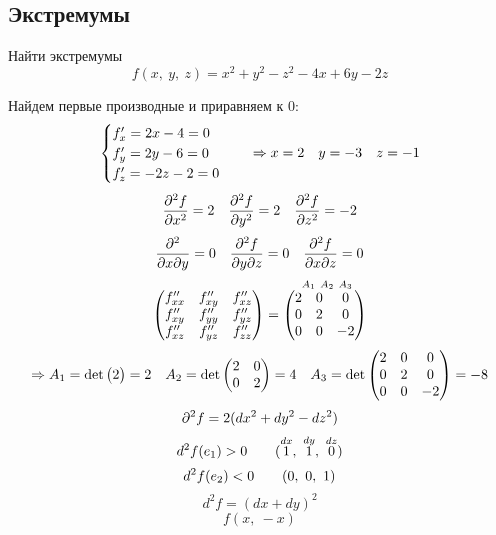 \documentclass[main]{subfiles}
\begin{document}
  \subsection{Экстремумы}

  \begin{example}
      Найти экстремумы
      \[f(x,\ y,\ z) = x^2 + y^2 - z^2 - 4x + 6y - 2z\]
  \end{example}

  \begin{sol}
      Найдем первые производные и приравняем к 0:
      \[\begin{cases}
        f'_x = 2x - 4 = 0\\
        f'_y = 2y - 6 = 0\\
        f'_z = - 2z - 2 = 0
      \end{cases} \quad \Rightarrow x = 2 \quad y = -3 \quad z = -1\]
      \[\dfrac{\partial^2 f}{\partial x^2} = 2 \quad \dfrac{\partial^2 f}{\partial y^2} = 2 \quad \dfrac{\partial^2 f}{\partial z^2} = - 2\]
      \[\dfrac{\partial^2 }{\partial x \partial y} = 0 \quad \dfrac{\partial^2 f}{\partial y \partial z} = 0 \quad \dfrac{\partial^2 f}{\partial x \partial z} = 0\]
      \[\begin{pmatrix}
        f''_{xx} & f''_{xy} & f''_{xz}\\
        f''_{xy} & f''_{yy} & f''_{yz}\\
        f''_{xz} & f''_{yz} & f''_{zz}
    \end{pmatrix} = \overset{\ A_1 \ A_2 \ A_3}{\begin{pmatrix}
        2 & 0 & 0\\
        0 & 2 & 0\\
        0 & 0 & -2
      \end{pmatrix}}\]
      \[\Rightarrow A_1 = \det \begin{pmatrix}
        2
      \end{pmatrix} = 2 \quad A_2 = \det \begin{pmatrix}
        2 & 0\\
        0 & 2
      \end{pmatrix} = 4 \quad A_3 = \det \begin{pmatrix}
        2 & 0 & 0\\
        0 & 2 & 0\\
        0 & 0 & -2
      \end{pmatrix} = -8\]
      \[\partial^2 f = 2 (d x^2 + dy^2 - dz^2)\]
      \[d^2 f (e_1) > 0 \qquad (\overset{dx}{1},\ \overset{dy}{1},\ \overset{dz}{0})\]
      \[d^2 f (e_2) < 0 \qquad (0,\ 0,\ 1)\]
      \[d^2 f = (dx + dy)^2\]
      \[f(x,\ -x)\]
  \end{sol}
\end{document}
